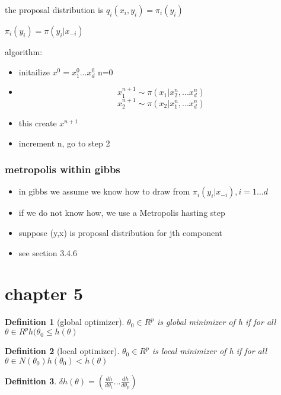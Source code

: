 \documentclass[10pt]{article}
\theoremstyle{break}
\newtheorem{defn}{Definition}[subsection]
\begin{document}
        the proposal distribution is 
        $q_i(x_i, y_i)=\pi_i(y_i)$

        $\pi_i(y_i)=\pi(y_i|x_{-i})$

        algorithm:
        \begin{itemize}
            \item initailize $x^0=x^0_1 ... x^0_d$ n=0 
            \item $$x_1^{n+1} \sim \pi(x_1|x_2^n, ... x_d^n)$$
            $$x_2^{n+1} \sim \pi(x_2|x_1^n, ... x_d^n)$$
            \item this create $x^{n+1}$
            \item increment n, go to step 2

        \end{itemize}
        \subsubsection{metropolis within gibbs}
            \begin{itemize}
                \item 
            in gibbs we assume we know how to draw from 
            $\pi_i(y_i|x_{-i}), i=1...d$
                \item if we do not know how, we use a Metropolis hasting step 
                \item suppose (y,x) is proposal distribution for jth component 
                \item see section 3.4.6 
            \end{itemize}


        \section{chapter 5}
            \begin{defn}[global optimizer]
                $\theta_0\in R^p$ is global minimizer of h if for all $\theta\in R^p
                h(\theta_0 \leq h(\theta)$
            \end{defn}
            \begin{defn}[local optimizer]
                $\theta_0\in R^p$ is local minimizer of h if for all $\theta\in N(\theta_0)
                h(\theta_0)<h(\theta)$
            \end{defn}

            \begin{defn}
                $\delta h(\theta)=(\frac{dh}{d\theta_1}... \frac{dh}{d\theta_p})$
            \end{defn}
\end{document}
